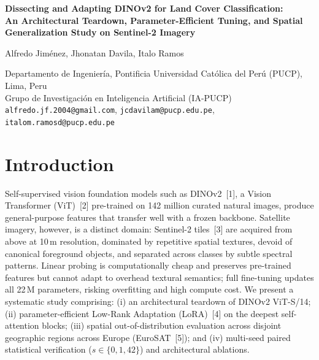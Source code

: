 \documentclass[10pt,a4paper]{article}
\begin{document}
\begin{center}
{\large\bfseries Dissecting and Adapting DINOv2 for Land Cover Classification:\\[1pt]
An Architectural Teardown, Parameter-Efficient Tuning, and Spatial Generalization Study on Sentinel-2 Imagery\par}
\vspace{0.45em}
{\normalsize Alfredo Jiménez, Jhonatan Davila, Italo Ramos\par}
\vspace{0.15em}
{\small Departamento de Ingeniería, Pontificia Universidad Católica del Perú (PUCP), Lima, Peru\\
Grupo de Investigación en Inteligencia Artificial (IA-PUCP)\\
\texttt{alfredo.jf.2004@gmail.com}, \texttt{jcdavilam@pucp.edu.pe}, \texttt{italom.ramosd@pucp.edu.pe}\par}
\end{center}
\vspace{-0.4em}

\section{Introduction}
Self-supervised vision foundation models such as DINOv2~[1], a Vision Transformer (ViT)~[2] pre-trained on 142 million curated natural images, produce general-purpose features that transfer well with a frozen backbone. Satellite imagery, however, is a distinct domain: Sentinel-2 tiles~[3] are acquired from above at 10\,m resolution, dominated by repetitive spatial textures, devoid of canonical foreground objects, and separated across classes by subtle spectral patterns. Linear probing is computationally cheap and preserves pre-trained features but cannot adapt to overhead textural semantics; full fine-tuning updates all 22\,M parameters, risking overfitting and high compute cost. We present a systematic study comprising: (i) an architectural teardown of DINOv2 ViT-S/14; (ii) parameter-efficient Low-Rank Adaptation (LoRA)~[4] on the deepest self-attention blocks; (iii) spatial out-of-distribution evaluation across disjoint geographic regions across Europe (EuroSAT~[5]); and (iv) multi-seed paired statistical verification ($s \in \{0, 1, 42\}$) and architectural ablations.
\end{document}
